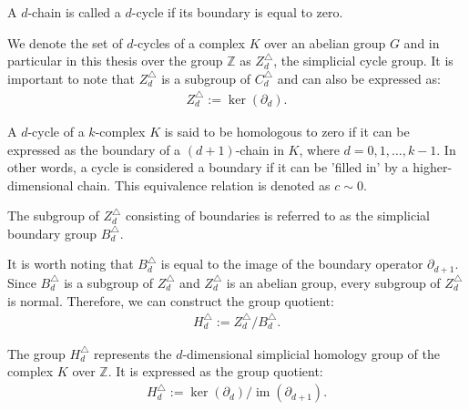 \begin{definition}[$d$-cycle]{\cite[\S 2, p. 106]{hatcher2005algebraic}}
	A $d$-chain is called a $d$-cycle if its boundary is equal to zero.
\end{definition}

We denote the set of \( d \)-cycles of a complex \( K \) over an abelian group $G$ and in particular in this thesis over the group \( \mathbb{Z} \) as \( Z^{\triangle}_{d} \), the simplicial cycle group. It is important to note that \( Z^{\triangle}_{d} \) is a subgroup of \( C^{\triangle}_{d} \) and can also be expressed as:
\begin{align}
	Z^{\triangle}_{d} := \ker(\partial_{d}). 
\end{align}

A \( d \)-cycle of a \( k \)-complex \( K \) is said to be homologous to zero if it can be expressed as the boundary of a \( (d+1) \)-chain in \( K \), where \( d = 0, 1, \ldots, k-1 \). In other words, a cycle is considered a boundary if it can be 'filled in' by a higher-dimensional chain. This equivalence relation is denoted as \( c \sim 0 \).

\begin{definition}{\cite[\S 2.3]{zomorodian2004computing}}
	The subgroup of $Z^{\triangle}_{d}$ consisting of boundaries is referred to as the simplicial boundary group $B^{\triangle}_{d}$.
\end{definition}

It is worth noting that \( B^{\triangle}_{d} \) is equal to the image of the boundary operator \( \partial_{d+1} \). Since \( B^{\triangle}_{d} \) is a subgroup of \( Z^{\triangle}_{d} \) and \( Z^{\triangle}_{d} \) is an abelian group, every subgroup of \( Z^{\triangle}_{d} \) is normal. Therefore, we can construct the group quotient:
\begin{align}
	H^{\triangle}_{d} := Z^{\triangle}_{d} / B^{\triangle}_{d}. 
\end{align}

\begin{definition}{\cite[\S 2, p. 106]{hatcher2005algebraic}} 
	The group \( H^{\triangle}_{d} \) represents the \( d \)-dimensional simplicial homology group of the complex \( K \) over \( \mathbb{Z} \). It is expressed as the group quotient:
	\begin{align}
		H^{\triangle}_{d} := \ker(\partial_{d}) / \operatorname{im}(\partial_{d+1}). 
	\end{align}
\end{definition}

